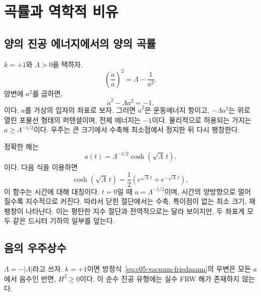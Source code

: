 \section{곡률과 역학적 비유}

\subsection{양의 진공 에너지에서의 양의 곡률}

\(k=+1\)와 \(\Lambda>0\)을 택하자.
\begin{equation}
\left(\frac{\dot a}{a}\right)^2=\Lambda-\frac{1}{a^2}.
\label{eq:c05-closed-vacuum}
\end{equation}
양변에 \(a^2\)를 곱하면,
\begin{equation}
\dot a^2-\Lambda a^2=-1.
\label{eq:c05-inverted-oscillator}
\end{equation}
이다. \(a\)를 가상의 입자의 좌표로 보자. 그러면 \(\dot a^2\)은 운동에너지 항이고, \(-\Lambda a^2\)는 위로 열린 포물선 형태의 퍼텐셜이며, 전체 에너지는 \(-1\)이다. 물리적으로 허용되는 가지는 \(a\geq\Lambda^{-1/2}\)이다. 우주는 큰 크기에서 수축해 최소점에서 정지한 뒤 다시 팽창한다.

정확한 해는
\begin{equation}
a(t)=\Lambda^{-1/2}\cosh(\sqrt{\Lambda}\,t).
\label{eq:c05-closed-desitter}
\end{equation}
이다. 다음 식을 이용하면
\begin{equation}
\cosh(\sqrt{\Lambda}\,t)
=
\frac12\left(e^{\sqrt{\Lambda}\,t}+e^{-\sqrt{\Lambda}\,t}\right),
\end{equation}
이 함수는 시간에 대해 대칭이다. \(t=0\)일 때 \(a=\Lambda^{-1/2}\)이며, 시간의 양방향으로 멀어질수록 지수적으로 커진다. 따라서 닫힌 절단에서는 수축, 특이점이 없는 최소 크기, 재팽창이 나타난다. 이는 평탄한 지수 절단과 전역적으로는 달라 보이지만, 두 좌표계 모두 같은 드시터 기하의 일부를 덮는다.

\subsection{음의 우주상수}

\(\Lambda=-|\Lambda|\)라고 쓰자. \(k=+1\)이면 방정식~\eqref{eq:c05-vacuum-friedmann}의 우변은 모든 \(a\)에서 음수인 반면, \(H^2\geq0\)이다. 이 순수 진공 유형에는 실수 FRW 해가 존재하지 않는다.

